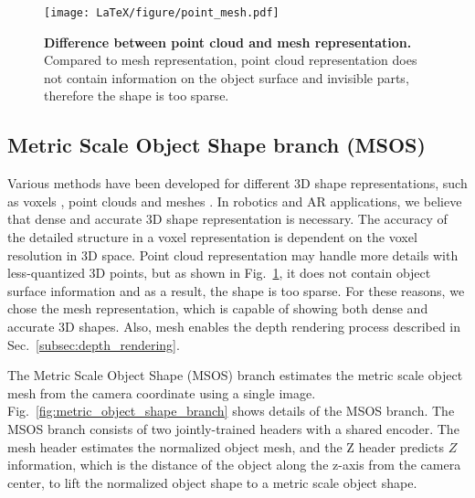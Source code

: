 \documentclass[letterpaper, 10 pt, journal, twoside]{IEEEtran}
\newcommand{\figref}[1]{Fig.~\ref{#1}}
\newcommand{\secref}[1]{Sec.~\ref{#1}}
\begin{document}
\begin{figure}
\begin{center}
\texttt{[image: LaTeX/figure/point\_mesh.pdf]} \\
\vspace{1.0mm}
\caption{\textbf{Difference between point cloud and mesh representation.} 
Compared to mesh representation, point cloud representation does not contain information on the object surface and invisible parts, therefore the shape is too sparse.
}
\label{fig:point_mesh}
\end{center}
\vspace{-5mm}
\end{figure}

\subsection{Metric Scale Object Shape branch (MSOS)}
\label{subsec:metric_scale_object_shape}
Various methods have been developed for different 3D shape representations, such as voxels \cite{choy20163d, brock2016generative,wu2016learning}, point clouds \cite{kurenkov2018deformnet, fan2017point, mandikal20183d} and meshes \cite{gkioxari2019mesh, groueix2018papier, pan2019deep, wang2018pixel2mesh}.
In robotics and AR applications, we believe that dense and accurate 3D shape representation is necessary.
The accuracy of the detailed structure in a voxel representation is dependent on the voxel resolution in 3D space.
Point cloud representation may handle more details with less-quantized 3D points, but as shown in \figref{fig:point_mesh}, it does not contain object surface information and as a result, the shape is too sparse.
For these reasons, we chose the mesh representation, which is capable of showing both dense and accurate 3D shapes.
Also, mesh enables the depth rendering process described in \secref{subsec:depth_rendering}.

The Metric Scale Object Shape (MSOS) branch estimates the metric scale object mesh from the camera coordinate using a single image.
\figref{fig:metric_object_shape_branch} shows details of the MSOS branch.
The MSOS branch consists of two jointly-trained headers with a shared encoder.
The mesh header estimates the normalized object mesh, and the Z header predicts $Z$ information, which is the distance of the object along the z-axis from the camera center, to lift the normalized object shape to a metric scale object shape.

\end{document}
